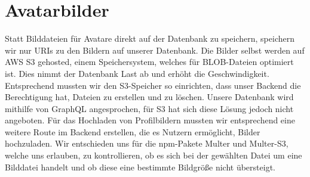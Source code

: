 \section{Avatarbilder}
Statt Bilddateien für Avatare direkt auf der Datenbank zu speichern, speichern wir nur URIs zu den Bildern auf unserer Datenbank. Die Bilder selbst werden auf AWS S3 gehosted, einem Speichersystem, welches für BLOB-Dateien optimiert ist. Dies nimmt der Datenbank Last ab und erhöht die Geschwindigkeit. Entsprechend mussten wir den S3-Speicher so einrichten, dass unser Backend die Berechtigung hat, Dateien zu erstellen und zu löschen. Unsere Datenbank wird mithilfe von GraphQL angesprochen, für S3 hat sich diese Lösung jedoch nicht angeboten. Für das Hochladen von Profilbildern mussten wir entsprechend eine weitere Route im Backend erstellen, die es Nutzern ermöglicht, Bilder hochzuladen. Wir entschieden uns für die npm-Pakete Multer und Multer-S3, welche uns erlauben, zu kontrollieren, ob es sich bei der gewählten Datei um eine Bilddatei handelt und ob diese eine bestimmte Bildgröße nicht übersteigt. 


